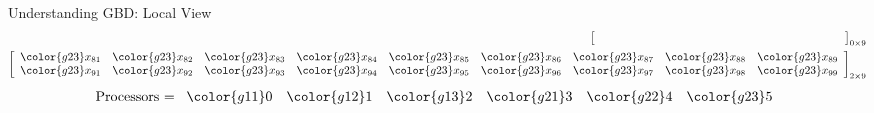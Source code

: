 \begin{frame}[shrink]
\begin{exampleblock}{Understanding GBD:  Local View}
\begin{align*}
\left[\begin{array}{lllllllll}
    &&&&&&&&\hspace{4.55cm} 
\end{array}\right]_{0\times 9}
\\
\left[\begin{array}{lllllllll}
      \color{g23}x_{81} & \color{g23}x_{82} & \color{g23}x_{83} & \color{g23}x_{84} & 
\color{g23}x_{85} & \color{g23}x_{86} & \color{g23}x_{87} & \color{g23}x_{88} & \color{g23}x_{89}\\
      \color{g23}x_{91} & \color{g23}x_{92} & \color{g23}x_{93} & \color{g23}x_{94} & 
\color{g23}x_{95} & \color{g23}x_{96} & \color{g23}x_{97} & \color{g23}x_{98} & \color{g23}x_{99}\\
\end{array}\right]_{2\times 9}
\end{align*}
\begin{align*}
\text{Processors = }
      \begin{array}{llllll}
      \color{g11}0 & \color{g12}1 & \color{g13}2 & \color{g21}3 & \color{g22}4 & \color{g23}5
      \end{array}
\end{align*}
\end{exampleblock}
\end{frame}

